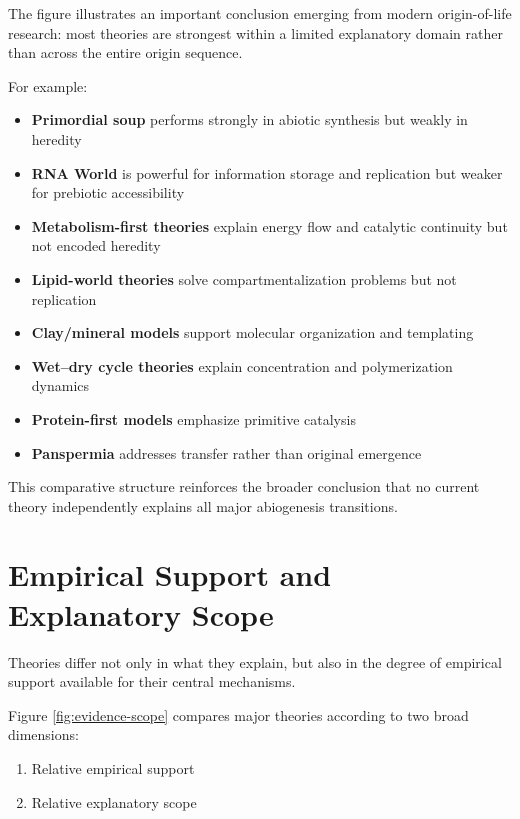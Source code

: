 \documentclass[
  oneside]{book}
\providecommand{\tightlist}{%
  \setlength{\itemsep}{0pt}\setlength{\parskip}{0pt}}
\begin{document}
The figure illustrates an important conclusion emerging from modern origin-of-life research: most theories are strongest within a limited explanatory domain rather than across the entire origin sequence.

For example:

\begin{itemize}
\tightlist
\item
  \textbf{Primordial soup} performs strongly in abiotic synthesis but weakly in heredity
\item
  \textbf{RNA World} is powerful for information storage and replication but weaker for prebiotic accessibility
\item
  \textbf{Metabolism-first theories} explain energy flow and catalytic continuity but not encoded heredity
\item
  \textbf{Lipid-world theories} solve compartmentalization problems but not replication
\item
  \textbf{Clay/mineral models} support molecular organization and templating
\item
  \textbf{Wet--dry cycle theories} explain concentration and polymerization dynamics
\item
  \textbf{Protein-first models} emphasize primitive catalysis
\item
  \textbf{Panspermia} addresses transfer rather than original emergence
\end{itemize}

This comparative structure reinforces the broader conclusion that no current theory independently explains all major abiogenesis transitions.

\section{Empirical Support and Explanatory Scope}\label{empirical-support-and-explanatory-scope}

Theories differ not only in what they explain, but also in the degree of empirical support available for their central mechanisms.

Figure \ref{fig:evidence-scope} compares major theories according to two broad dimensions:

\begin{enumerate}
\def\labelenumi{\arabic{enumi}.}
\tightlist
\item
  Relative empirical support
\item
  Relative explanatory scope
\end{enumerate}
\end{document}
